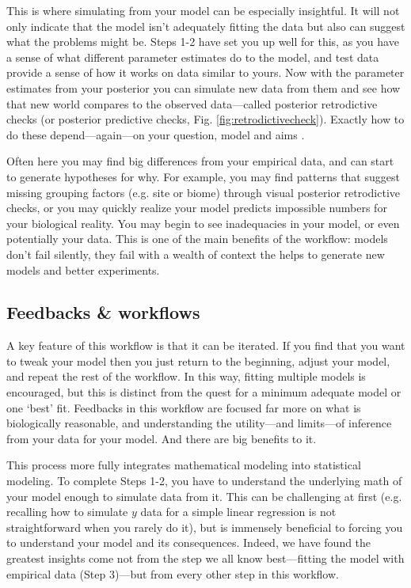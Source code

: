 \documentclass[11pt]{article}
\begin{document}
This is where simulating from your model can be especially insightful. It will not only indicate that the model isn't adequately fitting the data but also can suggest what the problems might be. Steps 1-2 have set you up well for this, as you have a sense of what different parameter estimates do to the model, and test data provide a sense of how it works on data similar to yours. Now with the parameter estimates from your posterior you can simulate new data from them and see how that new world compares to the observed data---called posterior retrodictive checks (or posterior predictive checks, Fig. \ref{fig:retrodictivecheck}). Exactly how to do these depend---again---on your question, model and aims \citep[see][]{held2010,gelman200ppc,conn2018}. 

Often here you may find big differences from your empirical data, and can start to generate hypotheses for why. For example, you may find patterns that suggest missing grouping factors (e.g. site or biome) through visual posterior retrodictive checks, or you may quickly realize your model predicts impossible numbers for your biological reality. You may begin to see inadequacies in your model, or even potentially your data.  This is one of the main benefits of the workflow: models don't fail silently, they fail with a wealth of context the helps to generate new models and better experiments.

\subsection*{Feedbacks \& workflows}
A key feature of this workflow is that it can be iterated.  If you find that you want to tweak your model then you just return to the beginning, adjust your model, and repeat the rest of the workflow. In this way, fitting multiple models is encouraged, but this is distinct from the quest for a minimum adequate model or one `best' fit. Feedbacks in this workflow are focused far more on what is biologically reasonable, and understanding the utility---and limits---of inference from your data for your model.  And there are big benefits to it. 

This process more fully integrates mathematical modeling into statistical modeling. To complete Steps 1-2, you have to understand the underlying math of your model enough to simulate data from it. This can be challenging at first (e.g. recalling how to simulate $y$ data for a simple linear regression is not straightforward when you rarely do it), but is immensely beneficial to forcing you to understand your model and its consequences. Indeed, we have found the greatest insights come not from the step we all know best---fitting the model with empirical data (Step 3)---but from every other step in this workflow. 
\end{document}
